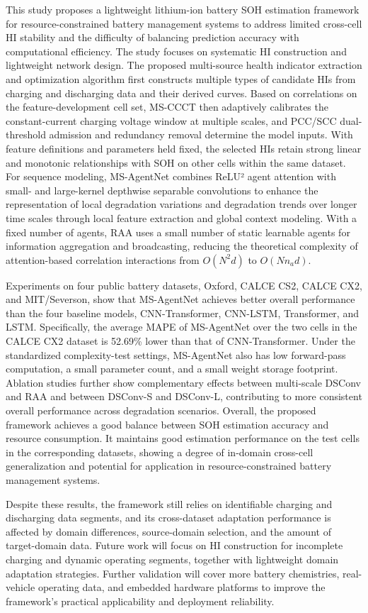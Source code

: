 This study proposes a lightweight lithium-ion battery SOH estimation framework for resource-constrained battery management systems to address limited cross-cell HI stability and the difficulty of balancing prediction accuracy with computational efficiency. The study focuses on systematic HI construction and lightweight network design. The proposed multi-source health indicator extraction and optimization algorithm first constructs multiple types of candidate HIs from charging and discharging data and their derived curves. Based on correlations on the feature-development cell set, MS-CCCT then adaptively calibrates the constant-current charging voltage window at multiple scales, and PCC/SCC dual-threshold admission and redundancy removal determine the model inputs. With feature definitions and parameters held fixed, the selected HIs retain strong linear and monotonic relationships with SOH on other cells within the same dataset. For sequence modeling, MS-AgentNet combines ReLU² agent attention with small- and large-kernel depthwise separable convolutions to enhance the representation of local degradation variations and degradation trends over longer time scales through local feature extraction and global context modeling. With a fixed number of agents, RAA uses a small number of static learnable agents for information aggregation and broadcasting, reducing the theoretical complexity of attention-based correlation interactions from $O(N^2d)$ to $O(Nn_a d)$.

Experiments on four public battery datasets, Oxford, CALCE CS2, CALCE CX2, and MIT/Severson, show that MS-AgentNet achieves better overall performance than the four baseline models, CNN-Transformer, CNN-LSTM, Transformer, and LSTM. Specifically, the average MAPE of MS-AgentNet over the two cells in the CALCE CX2 dataset is 52.69\% lower than that of CNN-Transformer. Under the standardized complexity-test settings, MS-AgentNet also has low forward-pass computation, a small parameter count, and a small weight storage footprint. Ablation studies further show complementary effects between multi-scale DSConv and RAA and between DSConv-S and DSConv-L, contributing to more consistent overall performance across degradation scenarios. Overall, the proposed framework achieves a good balance between SOH estimation accuracy and resource consumption. It maintains good estimation performance on the test cells in the corresponding datasets, showing a degree of in-domain cross-cell generalization and potential for application in resource-constrained battery management systems.

Despite these results, the framework still relies on identifiable charging and discharging data segments, and its cross-dataset adaptation performance is affected by domain differences, source-domain selection, and the amount of target-domain data. Future work will focus on HI construction for incomplete charging and dynamic operating segments, together with lightweight domain adaptation strategies. Further validation will cover more battery chemistries, real-vehicle operating data, and embedded hardware platforms to improve the framework's practical applicability and deployment reliability.
